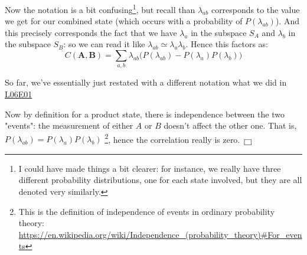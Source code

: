 \documentclass[solutions.tex]{subfiles}
\begin{document}
Now the notation is a bit confusing\footnote{I could have made things
a bit clearer: for instance, we really have three different probability
distributions, one for each state involved, but they are all denoted
very similarly.}, but recall than $\lambda_{ab}$ corresponds
to the value we get for our combined state (which occurs with a probability
of $P(\lambda_{ab})$). And this precisely corresponds the fact that we
have $\lambda_a$ in the subspace $S_A$ and $\lambda_b$ in the subspace $S_B$: so
we can read it like $\lambda_{ab} \simeq \lambda_a\lambda_b$. Hence this
factors as:
\[
	C(\bm{A},\bm{B}) = \sum_{a,b}
		\lambda_{ab}\bigl(P(\lambda_{ab})-P(\lambda_a)P(\lambda_b)
	\Bigr)
\]

\begin{remark} So far, we've essentially just restated with a different
notation what we did in
\href{https://github.com/mbivert/ttm/blob/master/qm/L06E01.pdf}{L06E01}
\end{remark}

Now by definition for a product state, there is independence between
the two "events": the measurement of either $A$ or $B$ doesn't affect
the other one. That is, $P(\lambda_{ab}) = P(\lambda_a)P(\lambda_b)$%
\footnote{This is the definition of independence of events in ordinary
probability theory: \url{https://en.wikipedia.org/wiki/Independence\_(probability\_theory)\#For_events}},
hence the correlation really is zero. $\qed$
\end{document}
